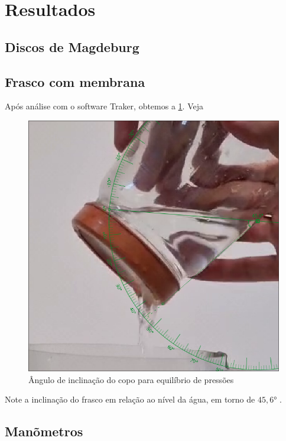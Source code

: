 \section{Resultados}
\subsection{Discos de Magdeburg}

\subsection{Frasco com membrana}

    Após análise com o software Traker, obtemos a \cref{copo.png}. Veja

    \begin{figure}[H]
        \centering
        \includegraphics[width=.5\linewidth]{fig/copo.png}
        \caption{Ângulo de inclinação do copo para equilíbrio de pressões}
        \label{copo.png}
    \end{figure}

    Note a inclinação do frasco em relação ao nível da água, em torno de \( 45,6 \)° .

\subsection{Manõmetros}
